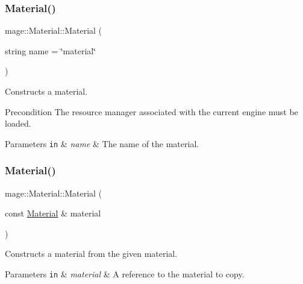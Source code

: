 \subsubsection{\texorpdfstring{Material()}{Material()}\hspace{0.1cm}{\footnotesize\ttfamily [1/3]}}
{\footnotesize\ttfamily mage\+::\+Material\+::\+Material (\begin{DoxyParamCaption}\item[{string}]{name = {\ttfamily \char`\"{}material\char`\"{}} }\end{DoxyParamCaption})\hspace{0.3cm}{\ttfamily [explicit]}}

Constructs a material.

\begin{DoxyPrecond}{Precondition}
The resource manager associated with the current engine must be loaded. 
\end{DoxyPrecond}

\begin{DoxyParams}[1]{Parameters}
\mbox{\tt in}  & {\em name} & The name of the material. \\
\hline
\end{DoxyParams}
\hypertarget{classmage_1_1_material_abed630412cdc4a6281389d128ec4b5f3}{}\label{classmage_1_1_material_abed630412cdc4a6281389d128ec4b5f3} 
\subsubsection{\texorpdfstring{Material()}{Material()}\hspace{0.1cm}{\footnotesize\ttfamily [2/3]}}
{\footnotesize\ttfamily mage\+::\+Material\+::\+Material (\begin{DoxyParamCaption}\item[{const \hyperlink{classmage_1_1_material}{Material} \&}]{material }\end{DoxyParamCaption})\hspace{0.3cm}{\ttfamily [default]}}

Constructs a material from the given material.


\begin{DoxyParams}[1]{Parameters}
\mbox{\tt in}  & {\em material} & A reference to the material to copy. \\
\hline
\end{DoxyParams}
\hypertarget{classmage_1_1_material_a41bfbc2bfa16e3694ac443d390b804c2}{}\label{classmage_1_1_material_a41bfbc2bfa16e3694ac443d390b804c2} 
